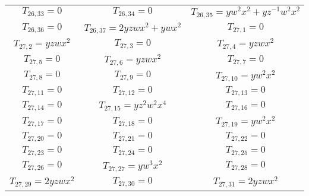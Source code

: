 \begin{longtable}{|c|c|c|}
$T_{26,33}= 0$&

$T_{26,34}= 0$&

$T_{26,35}= yw^2x^2+yz^{-1}w^2x^2$\\

$T_{26,36}= 0$&

$T_{26,37}= 2yzwx^2+ywx^2$&

$T_{27,1}= 0$\\

$T_{27,2}= yzwx^2$&

$T_{27,3}= 0$&

$T_{27,4}= yzwx^2$\\

$T_{27,5}= 0$&

$T_{27,6}= yzwx^2$&

$T_{27,7}= 0$\\

$T_{27,8}= 0$&

$T_{27,9}= 0$&

$T_{27,10}= yw^2x^2$\\

$T_{27,11}= 0$&

$T_{27,12}= 0$&

$T_{27,13}= 0$\\

$T_{27,14}= 0$&

$T_{27,15}= yz^2w^2x^4$&

$T_{27,16}= 0$\\

$T_{27,17}= 0$&

$T_{27,18}= 0$&

$T_{27,19}= yw^2x^2$\\

$T_{27,20}= 0$&

$T_{27,21}= 0$&

$T_{27,22}= 0$\\

$T_{27,23}= 0$&

$T_{27,24}= 0$&

$T_{27,25}= 0$\\

$T_{27,26}= 0$&

$T_{27,27}= yw^3x^2$&

$T_{27,28}= 0$\\

$T_{27,29}= 2yzwx^2$&

$T_{27,30}= 0$&

$T_{27,31}= 2yzwx^2$\\


\end{longtable}
